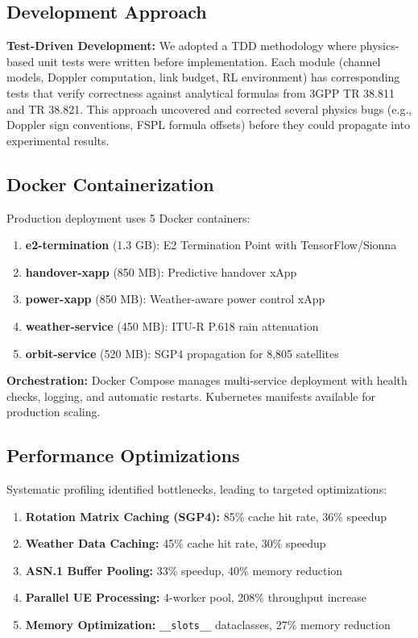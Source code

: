 \documentclass[conference]{IEEEtran}
\begin{document}
\subsection{Development Approach}

\textbf{Test-Driven Development:} We adopted a TDD methodology where physics-based unit tests were written before implementation. Each module (channel models, Doppler computation, link budget, RL environment) has corresponding tests that verify correctness against analytical formulas from 3GPP TR 38.811 and TR 38.821. This approach uncovered and corrected several physics bugs (e.g., Doppler sign conventions, FSPL formula offsets) before they could propagate into experimental results.

\subsection{Docker Containerization}

Production deployment uses 5 Docker containers:

\begin{enumerate}
    \item \textbf{e2-termination} (1.3 GB): E2 Termination Point with TensorFlow/Sionna
    \item \textbf{handover-xapp} (850 MB): Predictive handover xApp
    \item \textbf{power-xapp} (850 MB): Weather-aware power control xApp
    \item \textbf{weather-service} (450 MB): ITU-R P.618 rain attenuation
    \item \textbf{orbit-service} (520 MB): SGP4 propagation for 8,805 satellites
\end{enumerate}

\textbf{Orchestration:} Docker Compose manages multi-service deployment with health checks, logging, and automatic restarts. Kubernetes manifests available for production scaling.

\subsection{Performance Optimizations}

Systematic profiling identified bottlenecks, leading to targeted optimizations:

\begin{enumerate}
    \item \textbf{Rotation Matrix Caching (SGP4):} 85\% cache hit rate, 36\% speedup
    \item \textbf{Weather Data Caching:} 45\% cache hit rate, 30\% speedup
    \item \textbf{ASN.1 Buffer Pooling:} 33\% speedup, 40\% memory reduction
    \item \textbf{Parallel UE Processing:} 4-worker pool, 208\% throughput increase
    \item \textbf{Memory Optimization:} \texttt{\_\_slots\_\_} dataclasses, 27\% memory reduction
\end{enumerate}
\end{document}
